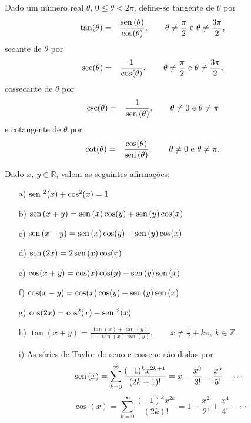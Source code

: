 \begin{defn}
Dado um número real $\theta$, $0\leq \theta<2\pi$, define-se tangente de $\theta$ por
\begin{eqnarray*}
\tan(\theta)&=&\frac{\operatorname{sen}\,(\theta)}{\cos(\theta)},\qquad \theta\neq \frac{\pi}{2}\ \hbox{e}\ \theta\neq \frac{3\pi}{2},\\
\end{eqnarray*}
secante de $\theta$ por
\begin{eqnarray*}
\sec(\theta)&=&\frac{1}{\cos(\theta)},\qquad \theta\neq \frac{\pi}{2}\ \hbox{e}\ \theta\neq \frac{3\pi}{2},\\
\end{eqnarray*}
cossecante de $\theta$ por
\begin{eqnarray*}
\csc(\theta)&=&\frac{1}{\sen(\theta)},\qquad \theta\neq 0\ \hbox{e}\ \theta\neq \pi\\
\end{eqnarray*}
e
cotangente de $\theta$ por
\begin{eqnarray*}
\cot(\theta)&=&\frac{\cos(\theta)}{\operatorname{sen}\,(\theta)},\qquad \theta\neq 0\ \hbox{e}\ \theta\neq \pi.\\
\end{eqnarray*}
\end{defn}
\begin{prop} Dado $x,\ y\in \mathbb{R}$, valem as seguintes afirmações:
\begin{itemize}
\item[a)] $\operatorname{sen}\,^2(x)+\cos^2(x)=1$
\item[b)] $\operatorname{sen}\,(x+y)=\operatorname{sen}\,(x)\cos(y)+\operatorname{sen}\,(y)\cos(x)$
\item[c)] $\operatorname{sen}\,(x-y)=\operatorname{sen}\,(x)\cos(y)-\operatorname{sen}\,(y)\cos(x)$
\item[d)] $\operatorname{sen}\,(2x)=2\operatorname{sen}\,(x)\cos(x)$
\item[e)] $\cos(x+y)=\cos(x)\cos(y)-\operatorname{sen}\,(y)\operatorname{sen}\,(x)$
\item[f)] $\cos(x-y)=\cos(x)\cos(y)+\operatorname{sen}\,(y)\operatorname{sen}\,(x)$
\item[g)] $\cos(2x)=\cos^2(x)-\operatorname{sen}\,^2(x)$
\item[h)] $\tan(x+y)=\frac{\tan(x)+\tan(y)}{1-\tan(x)\tan(y)},\qquad x\neq \frac{\pi}{2}+k\pi,\ k\in\mathbb{Z}.$
\item[i)] As séries de Taylor do seno e cosseno são dadas por
\begin{equation}\operatorname{sen}\,(x)=\sum_{k=0}^\infty\frac{(-1)^k x^{2k+1}}{(2k+1)!}=x-\frac{x^3}{3!}+\frac{x^5}{5!}-\cdots \end{equation}
\begin{equation}\cos(x)=\sum_{k=0}^\infty\frac{(-1)^k x^{2k}}{(2k)!}=1-\frac{x^2}{2!}+\frac{x^4}{4!}-\cdots \end{equation}
\end{itemize}
\end{prop}

